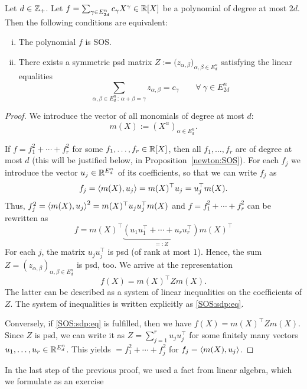 \begin{proposition}
	\label{sos:as:sdp:feasibility}
	Let $d \in \mathbb{Z}_+$. Let $f = \sum_{ \gamma \in E_{2d}^n} c_\gamma X^\gamma \in \mathbb{R}[X]$ be a polynomial of degree at most $2d$. Then the following conditions are equivalent:
	\begin{enumerate}[(i)]
		\item The polynomial $f$ is SOS. 
		\item There exists a symmetric psd matrix $Z:= \bigl(z_{\alpha,\beta})_{\alpha,\beta \in E_d^n}$ satisfying the linear equalities 
		\begin{equation}
			\sum_{\alpha, \beta \in E_d^n \, : \, \alpha + \beta = \gamma} z_{\alpha, \beta} = c_\gamma \qquad \forall \ \gamma \in E_{2 d}^n \label{SOS:sdp:eq}
		\end{equation}
	\end{enumerate}
\end{proposition}
\begin{proof}
	We introduce the vector of all monomials of degree at most $d$: 
	\[
		m(X):=(X^\alpha)_{\alpha \in E_d^n}.
	\]
	
	If $f = f_1^2 + \cdots + f_r^2$ for some $f_1,\ldots,f_r \in \mathbb{R}[X]$, then all $f_1,\ldots,f_r$ are of degree at most $d$ (this will be justified below, in Proposition~\ref{newton:SOS}). For each $f_j$ we introduce the vector $u_j \in \mathbb{R}^{E_d^n}$ of its coefficients, so that we can write $f_j$ as 
	\[
		f_j = \left\langle m(X) , u_j \right\rangle = m(X)^\top u_j = u_j^\top m(X).
	\]
	Thus, $f_j^2 = \left\langle m(X) , u_j \right\rangle^2 = m(X)^\top u_j u_j^\top m(X)$ and $f=f_1^2 + \cdots + f_r^2$ can be rewritten as 
	\[ 
		f = m(X)^\top \underbrace{(u_1 u_1^\top + \cdots + u_r u_r^\top )}_{=:Z} m(X)^\top
	\]
	For each $j$, the matrix $u_j u_j^\top$ is psd (of rank at most $1$). Hence, the sum $Z = (z_{\alpha,\beta})_{\alpha,\beta \in E_d^n}$ is psd, too. We arrive at the representation 
	\[
		f(X) = m(X)^\top Z m(X).
	\]
	The latter can be described as a system of linear inequalities on the coefficients of $Z$. The system of inequalities is written explicitly as \eqref{SOS:sdp:eq}. 
	
	Conversely, if \eqref{SOS:sdp:eq} is fulfilled, then we have $f(X)= m(X)^\top Z m(X)$. Since $Z$ is psd, we can write it as $Z = \sum_{j=1}^r u_j u_j^\top$ for some finitely many vectors $u_1,\ldots,u_r \in \mathbb{R}^{E_d^n}$. This yields $=f_1^2 + \cdots + f_j^2$ for $f_j = \left\langle m(X) , u_j \right\rangle$. 
\end{proof}

In the last step of the previous proof, we used a fact from linear algebra, which we formulate as an exercise


